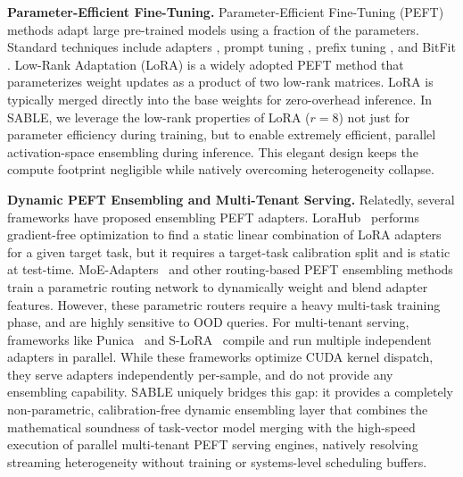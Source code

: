 \textbf{Parameter-Efficient Fine-Tuning.} Parameter-Efficient Fine-Tuning (PEFT) methods adapt large pre-trained models using a fraction of the parameters. Standard techniques include adapters \cite{houlsby2019parameter, pfeiffer2020adapterhub, tay2022transporter, hou2022multi}, prompt tuning \cite{lester2021power, dou2022multi}, prefix tuning \cite{li2021prefix}, and BitFit \cite{zaken2022bitfit}. Low-Rank Adaptation (LoRA) \cite{hu2021lora} is a widely adopted PEFT method that parameterizes weight updates as a product of two low-rank matrices. LoRA is typically merged directly into the base weights for zero-overhead inference. In SABLE, we leverage the low-rank properties of LoRA ($r=8$) not just for parameter efficiency during training, but to enable extremely efficient, parallel activation-space ensembling during inference. This elegant design keeps the compute footprint negligible while natively overcoming heterogeneity collapse.

\textbf{Dynamic PEFT Ensembling and Multi-Tenant Serving.} Relatedly, several frameworks have proposed ensembling PEFT adapters. LoraHub~\cite{huang2023lorahub} performs gradient-free optimization to find a static linear combination of LoRA adapters for a given target task, but it requires a target-task calibration split and is static at test-time. MoE-Adapters~\cite{moeadapters} and other routing-based PEFT ensembling methods train a parametric routing network to dynamically weight and blend adapter features. However, these parametric routers require a heavy multi-task training phase, and are highly sensitive to OOD queries. For multi-tenant serving, frameworks like Punica~\cite{punica} and S-LoRA~\cite{slora} compile and run multiple independent adapters in parallel. While these frameworks optimize CUDA kernel dispatch, they serve adapters independently per-sample, and do not provide any ensembling capability. SABLE uniquely bridges this gap: it provides a completely non-parametric, calibration-free dynamic ensembling layer that combines the mathematical soundness of task-vector model merging with the high-speed execution of parallel multi-tenant PEFT serving engines, natively resolving streaming heterogeneity without training or systems-level scheduling buffers.
